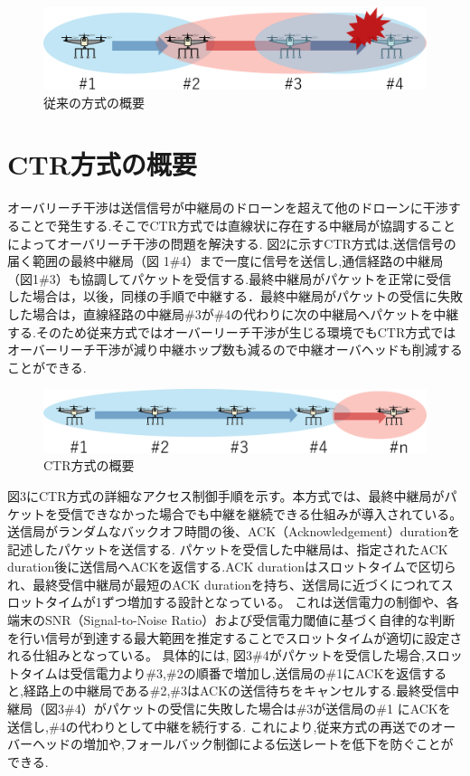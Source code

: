 \documentclass[a4paper,10pt]{ltjsarticle}
\begin{document}
\begin{figure}[H]
  \centering
  \includegraphics[width=\linewidth]{cenventional_topology.pdf} %
  \caption{従来の方式の概要}
  \label{fig:従来の方式のトポロジー} %
\end{figure}

\section{CTR方式の概要}
オーバリーチ干渉は送信信号が中継局のドローンを超えて他のドローンに干渉することで発生する.そこでCTR方式では直線状に存在する中継局が協調することによってオーバリーチ干渉の問題を解決する.
図2に示すCTR方式は,送信信号の届く範囲の最終中継局（図 1\#4）まで一度に信号を送信し,通信経路の中継局（図1\#3）も協調してパケットを受信する.最終中継局がパケットを正常に受信した場合は，以後，同様の手順で中継する．最終中継局がパケットの受信に失敗した場合は，直線経路の中継局\#3が\#4の代わりに次の中継局へパケットを中継する.そのため従来方式ではオーバーリーチ干渉が生じる環境でもCTR方式ではオーバーリーチ干渉が減り中継ホップ数も減るので中継オーバヘッドも削減することができる.

\begin{figure}[H]
  \centering
  \includegraphics[width=\linewidth]{CTR_topology.pdf} %
  \caption{CTR方式の概要}
  \label{fig:CTR方式のトポロジー} %
\end{figure}

図3にCTR方式の詳細なアクセス制御手順を示す。本方式では、最終中継局がパケットを受信できなかった場合でも中継を継続できる仕組みが導入されている。送信局がランダムなバックオフ時間の後、ACK（Acknowledgement）durationを記述したパケットを送信する.
パケットを受信した中継局は、指定されたACK duration後に送信局へACKを返信する.ACK durationはスロットタイムで区切られ、最終受信中継局が最短のACK durationを持ち、送信局に近づくにつれてスロットタイムが1ずつ増加する設計となっている。
これは送信電力の制御や、各端末のSNR（Signal-to-Noise Ratio）および受信電力閾値に基づく自律的な判断を行い信号が到達する最大範囲を推定することでスロットタイムが適切に設定される仕組みとなっている。
具体的には, 図3\#4がパケットを受信した場合,スロットタイムは受信電力より\#3,\#2の順番で増加し,送信局の\#1にACKを返信すると,経路上の中継局である\#2,\#3はACKの送信待ちをキャンセルする.最終受信中継局（図3\#4）がパケットの受信に失敗した場合は\#3が送信局の\#1 にACKを送信し,\#4の代わりとして中継を続行する.
これにより,従来方式の再送でのオーバーヘッドの増加や,フォールバック制御による伝送レートを低下を防ぐことができる.
\end{document}
